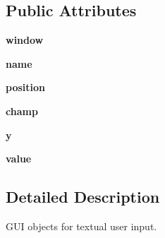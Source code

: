 \subsection*{Public Attributes}
\begin{DoxyCompactItemize}
\item 
\hypertarget{classEntryText_1_1EntryText_a0a16866dc494a51bf277be331e770973}{{\bfseries window}}\label{classEntryText_1_1EntryText_a0a16866dc494a51bf277be331e770973}

\item 
\hypertarget{classEntryText_1_1EntryText_af3b56e75559c38826087608d7ad0a219}{{\bfseries name}}\label{classEntryText_1_1EntryText_af3b56e75559c38826087608d7ad0a219}

\item 
\hypertarget{classEntryText_1_1EntryText_a0d431291077da8a406d74e19102f5b13}{{\bfseries position}}\label{classEntryText_1_1EntryText_a0d431291077da8a406d74e19102f5b13}

\item 
\hypertarget{classEntryText_1_1EntryText_a8f54c9fee0f57bac6508a0b153d35350}{{\bfseries champ}}\label{classEntryText_1_1EntryText_a8f54c9fee0f57bac6508a0b153d35350}

\item 
\hypertarget{classEntryText_1_1EntryText_a04dc0d7a0f8607d43753d2f6bbfbb204}{{\bfseries y}}\label{classEntryText_1_1EntryText_a04dc0d7a0f8607d43753d2f6bbfbb204}

\item 
\hypertarget{classEntryText_1_1EntryText_a943152643b1f49e3f4e318752b37edae}{{\bfseries value}}\label{classEntryText_1_1EntryText_a943152643b1f49e3f4e318752b37edae}

\end{DoxyCompactItemize}


\subsection{Detailed Description}
G\+U\+I objects for textual user input. 

